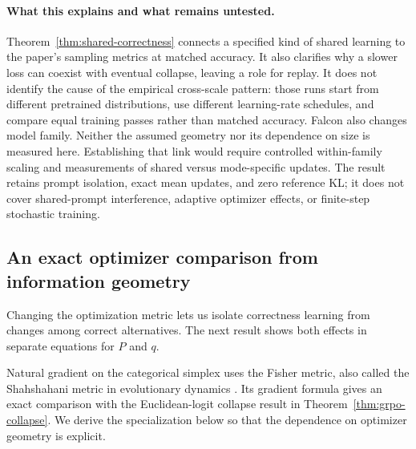 \paragraph{What this explains and what remains untested.}
Theorem~\ref{thm:shared-correctness} connects a specified kind of shared
learning to the paper's sampling metrics at matched accuracy. It also
clarifies why a slower loss can coexist with eventual collapse, leaving a
role for replay. It does not identify the cause of the empirical cross-scale
pattern: those runs start from different pretrained distributions, use
different learning-rate schedules, and compare equal training passes rather
than matched accuracy. Falcon also changes model family. Neither the assumed
geometry nor its dependence on size is measured here. Establishing that link
would require controlled within-family scaling and measurements of shared
versus mode-specific updates. The result retains prompt isolation, exact
mean updates, and zero reference KL; it does not cover shared-prompt
interference, adaptive optimizer effects, or finite-step stochastic training.

\subsection{An exact optimizer comparison from information geometry}
\label{app:theory-natural-gradient}

Changing the optimization metric lets us isolate correctness learning from
changes among correct alternatives. The next result shows both effects in
separate equations for $P$ and $q$.


Natural gradient on the categorical simplex uses the Fisher metric, also
called the Shahshahani metric in evolutionary dynamics
\citep[Sections~2.3 and~3.1]{harper2009informationgeometry}. Its gradient
formula gives an exact comparison with the Euclidean-logit collapse result
in Theorem~\ref{thm:grpo-collapse}. We derive the specialization below so
that the dependence on optimizer geometry is explicit.

